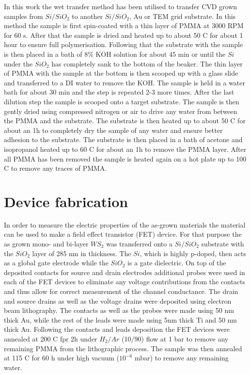 In this work the wet transfer method has been utilised to transfer CVD grown samples from $Si/SiO_2$ to another $Si/SiO_2$, Au or TEM grid substrate. In this method the sample is first spin-coated with a thin layer of PMMA at 3000 RPM for 60 s. After that the sample is dried and heated up to about 50 {\degree}C for about 1 hour to ensure full polymerisation. Following that the substrate with the sample is then placed in a bath of 8\% KOH solution for about 45 min or until the $Si$ under the $SiO_2$ has completely sank to the bottom of the beaker. The thin layer of PMMA with the sample at the bottom is then scooped up with a glass slide and transferred to a DI water to remove the KOH. The sample is held in a water bath for about 30 min and the step is repeated 2-3 more times. After the last dilution step the sample is scooped onto a target substrate. The sample is then gently dried using compressed nitrogen or air to drive any water from between the PMMA and the substrate. The substrate is then heated up to about 50 {\degree}C for about an 1h to completely dry the sample of any water and ensure better adhesion to the substrate. The substrate is then placed in a bath of acetone and isopropanol heated up to 60 {\degree}C for about an 1h to remove the PMMA layer. After all PMMA has been removed the sample is heated again on a hot plate up to 100 {\degree}C to remove any traces of PMMA.

\section{Device fabrication}

In order to measure the electric properties of the as-grown materials the material can be used to make a field effect transistor (FET) device. For that purpose the as grown mono- and bi-layer $WS_2$ was transferred onto a $Si/SiO_2$ substrate with the $SiO_2$ layer of 285 nm in thickness. The $Si$, which is highly p-doped, then acts as a global gate electrode while the $SiO_2$ is a gate dielectric. On top of the deposited contacts for source and drain electrodes additional probes were used in each of the FET devices to eliminate any voltage contributions from the contacts and thus allow for correct measurement of the channel conductance. The drain and source drains as well as the voltage drains were deposited using electron beam lithography. The contacts as well as the probes were made using 50 nm thick Au, while the rest of the leads were made using 5nm thick Ti and 50 nm thick Au. Following the contacts and leads deposition the FET devices were annealed at 200 {\degree}C fpr 2h under $H_2/Ar$ (10/90) flow at 1 bar to remove any remaining PMMA from the lithographic process. The sample was then annealed at 115 {\degree}C for 60 h under high vacuum ($10^{-6}$ mbar) to remove any remaining water.

